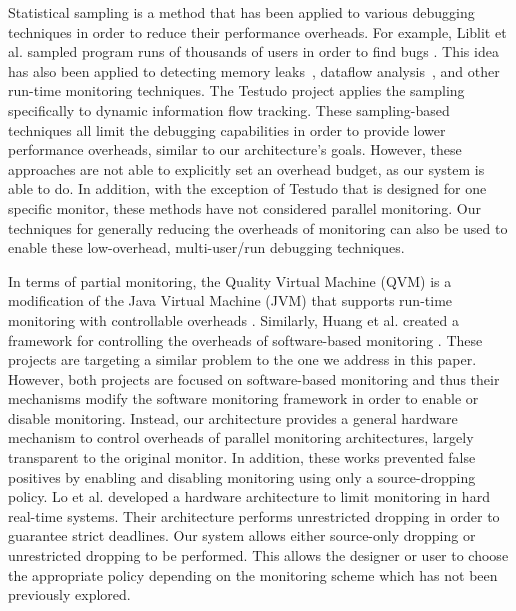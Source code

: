 Statistical sampling is a method that has been applied to various debugging
techniques in order to reduce their performance overheads. For example, Liblit
et al. sampled program runs of thousands of users in order to find bugs
\cite{liblit-pldi05}. This idea has also been applied to detecting memory
leaks~\cite{chilimbi-asplos04}, dataflow analysis~\cite{greathouse-cgo11}, and
other run-time monitoring techniques. The Testudo project
\cite{testudo-micro08} applies the sampling specifically to dynamic information
flow tracking. %
These sampling-based techniques all limit the debugging capabilities in order
to provide lower performance overheads, similar to our architecture's goals.
However, these approaches are not able to explicitly set an overhead budget, as
our system is able to do. In addition, with the exception of Testudo that is
designed for one specific monitor, these
methods have not considered parallel monitoring. Our techniques for generally
reducing the overheads of monitoring can also be used to enable these
low-overhead, multi-user/run debugging techniques.

In terms of partial monitoring, the Quality Virtual Machine (QVM) is a
modification of the Java Virtual Machine (JVM) that supports run-time
monitoring with controllable overheads \cite{qvm-oopsla08}. Similarly, Huang et
al. created a framework for controlling the overheads of software-based
monitoring \cite{huang-sttt12}. These projects are targeting a similar problem
to the one we address in this paper. However, both projects are focused on
software-based monitoring and thus their mechanisms modify the software
monitoring framework in order to enable or disable monitoring. Instead, our
architecture provides a general hardware mechanism to control overheads of
parallel monitoring architectures, largely transparent to the original monitor. 
In addition, these works prevented
false positives by enabling and disabling monitoring using only a source-dropping
policy. Lo et al. \cite{lo-rtas14} developed a hardware architecture to limit
monitoring in hard real-time systems. Their architecture performs unrestricted 
dropping in order to guarantee strict deadlines. 
Our system allows either source-only dropping or unrestricted dropping to be performed.
This allows the designer or user to choose the appropriate policy depending on
the monitoring scheme which has not been previously explored.
